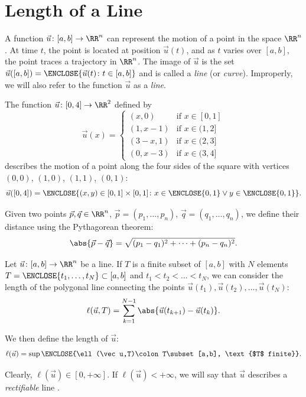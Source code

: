 \section{Length of a Line}

A function $\vec u\colon [a,b]\to \RR^n$ can represent the motion of a point in
the space $\RR^n$. At time $t$, the point is located at position $\vec u(t)$,
and as $t$ varies over $[a,b]$, the point traces a trajectory in $\RR^n$. The
image of $\vec u$ is the set $\vec u([a,b]) =\ENCLOSE{\vec u(t)\colon
t\in[a,b]}$ and is called a \emph{line} (or \emph{curve}). Improperly, we will
also refer to the function $\vec u$ as a \emph{line}.

\begin{example}[square]
The function $\vec u \colon [0,4]\to \RR^2$ defined by 
\[
\vec u(x) = \begin{cases} 
     (x,0) & \text{if $x\in [0,1]$} \\
     (1,x-1) & \text{if $x\in (1,2]$} \\
     (3-x,1) & \text{if $x\in (2,3]$} \\
     (0,x-3) & \text{if $x\in (3,4]$}
\end{cases}
\]
describes the motion of a point along the four sides of the square with vertices
$(0,0)$, $(1,0)$, $(1,1)$, $(0,1)$:
\[
 \vec u([0,4]) = \ENCLOSE{(x,y)\in[0,1]\times[0,1]\colon 
 x\in\ENCLOSE{0,1} \lor y \in \ENCLOSE{0,1}}.  
\]
\end{example}

Given two points $\vec p, \vec q \in \RR^n$, $\vec p = (p_1,\dots, p_n)$, $\vec
q=(q_1,\dots,q_n)$, we define their distance using the Pythagorean theorem:
\[
 \abs{\vec p - \vec q} = \sqrt{(p_1-q_1)^2 + \dots + (p_n-q_n)^2}.  
\]

\begin{definition}
Let $\vec u\colon[a,b]\to \RR^n$ be a line. If $T$ is a finite subset of $[a,b]$
with $N$ elements $T=\ENCLOSE{t_1, \dots, t_N}\subset [a,b]$ and $t_1< t_2 <
\dots < t_N$, we can consider the length of the polygonal line connecting the
points $\vec u(t_1), \vec u(t_2), \dots, \vec u(t_N)$:
\[
\ell(\vec u, T) = \sum_{k=1}^{N-1} \abs{\vec u(t_{k+1})-\vec u(t_k)}.  
\]

We then define the length of $\vec u$:
\[
\ell(\vec u) = \sup\ENCLOSE{\ell(\vec u,T)\colon T\subset [a,b], \text{$T$ finite}}.  
\]

Clearly, $\ell(\vec u) \in [0,+\infty]$. If $\ell(\vec u)<+\infty$, we will say
that $\vec u$ describes a \emph{rectifiable} line%
.
\end{definition}

